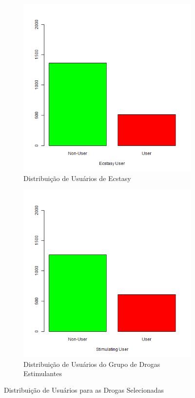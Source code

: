 \documentclass[
	article,			%
	11pt,				%
	oneside,			%
	a4paper,			%
	english,			%
	brazil,				%
	sumario=tradicional
	]{abntex2}
\begin{document}
\begin{figure}[H]
\centering
\begin{subfigure}{.5\textwidth}
  \centering
  \includegraphics[width=\linewidth]{figuras/dist_user_ecstasy.png}
  \caption{Distribuição de Usuários de Ecstasy}
  \label{distecs}
\end{subfigure}%
\begin{subfigure}{.5\textwidth}
  \centering
  \includegraphics[width=\linewidth]{figuras/dist_user_stimulating.png}
  \caption{Distribuição de Usuários do Grupo de Drogas Estimulantes}
  \label{diststim}
\end{subfigure}
\caption{Distribuição de Usuários para as Drogas Selecionadas}
\label{user2}
\end{figure}
\end{document}
